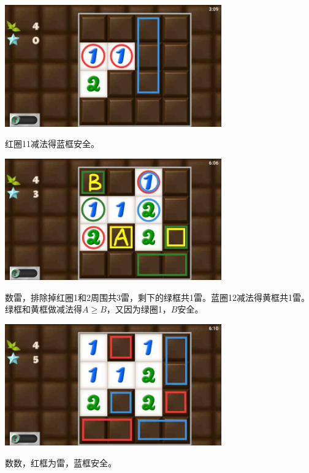 \subsection{} %
\begin{center}
    \includegraphics[width=0.7\textwidth]{puzzlelow/39-1.jpg}
\end{center}
红圈11减法得蓝框安全。
\begin{center}
    \includegraphics[width=0.7\textwidth]{puzzlelow/39-2.jpg}
\end{center}
数雷，排除掉红圈1和2周围共3雷，剩下的绿框共1雷。蓝圈12减法得黄框共1雷。绿框和黄框做减法得$A\ge B$，又因为绿圈1，$B$安全。
\begin{center}
    \includegraphics[width=0.7\textwidth]{puzzlelow/39-3.jpg}
\end{center}
数数，红框为雷，蓝框安全。

